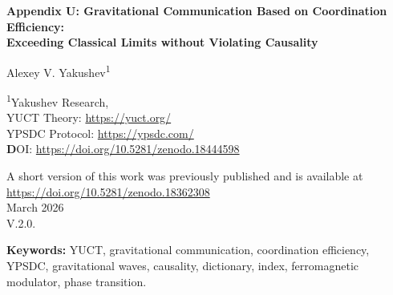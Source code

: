 \documentclass[12pt,a4paper]{article}
\newcommand{\Keff}{K_{\mathrm{eff}}}
\begin{document}
	
	\begin{titlepage}
		\begin{center}
			\vspace*{1cm}
			\Huge \textbf{Appendix U: Gravitational Communication Based on Coordination Efficiency: \\ Exceeding Classical Limits without Violating Causality}
			
			\vspace{1cm}
			\Large Alexey V. Yakushev\textsuperscript{1}
			
			\vspace{0.5cm}
			\large \textsuperscript{1}Yakushev Research, \\ 	YUCT Theory: \url{https://yuct.org/}\\
			YPSDC Protocol: \url{https://ypsdc.com/}\\
			
			
			\vspace{2cm}
			\textbf DOI: \url{https://doi.org/10.5281/zenodo.18444598}\\
			
			\vspace{1cm}
			
			\vspace{0cm}
			\large 
			A short version of this work was previously published and is available at\\ \url{https://doi.org/10.5281/zenodo.18362308}\\
			\vspace{1cm}
			March 2026 \\ \large V.2.0.
			
			\vspace{2cm}
			\newpage
			\begin{abstract}
				\noindent
				We propose a novel approach to long‑distance communication based on the Yakushev Unified Coordination Theory (YUCT). By treating the gravitational field as a naturally occurring global dictionary, we show that short indices (gravitational perturbations) can coordinate states between distant observers with an effective efficiency \(\Keff\) that formally exceeds the speed‑of‑light limit, yet without violating causality. The key lies in the separation of offline dictionary distribution (the pre‑existing gravitational field) and online index transmission (a light‑speed gravitational wave). Gravitational waves penetrate matter without attenuation, offering a significant advantage over electromagnetic signals. We derive the fundamental equations, estimate achievable efficiencies, and propose an experimental test using high‑precision gravimeters. This work opens a pathway toward a new class of communication systems where latency is determined by local processing rather than distance.
			\end{abstract}
			
			\vspace{0.5cm}
			\noindent \textbf{Keywords:} YUCT, gravitational communication, coordination efficiency, YPSDC, gravitational waves, causality, dictionary, index, ferromagnetic modulator, phase transition.
		\end{center}
	\end{titlepage}
	
\end{document}
